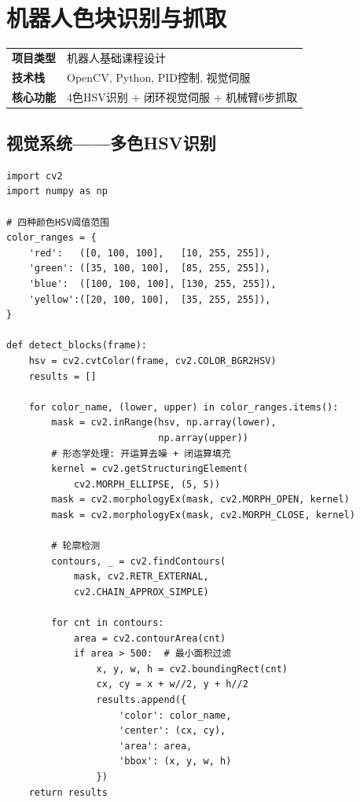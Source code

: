 \documentclass[12pt,a4paper]{ctexart}
\begin{document}
\newpage
\section{机器人色块识别与抓取}

\begin{infobox}[项目概况]
\begin{tabular}{ll}
\textbf{项目类型} & 机器人基础课程设计 \\
\textbf{技术栈}   & OpenCV, Python, PID控制, 视觉伺服 \\
\textbf{核心功能} & 4色HSV识别 + 闭环视觉伺服 + 机械臂6步抓取
\end{tabular}
\end{infobox}

\subsection{视觉系统——多色HSV识别}

\begin{lstlisting}[style=pythonstyle, caption={OpenCV多色HSV空间色块检测}]
import cv2
import numpy as np

# 四种颜色HSV阈值范围
color_ranges = {
    'red':   ([0, 100, 100],   [10, 255, 255]),
    'green': ([35, 100, 100],  [85, 255, 255]),
    'blue':  ([100, 100, 100], [130, 255, 255]),
    'yellow':([20, 100, 100],  [35, 255, 255]),
}

def detect_blocks(frame):
    hsv = cv2.cvtColor(frame, cv2.COLOR_BGR2HSV)
    results = []

    for color_name, (lower, upper) in color_ranges.items():
        mask = cv2.inRange(hsv, np.array(lower),
                           np.array(upper))
        # 形态学处理: 开运算去噪 + 闭运算填充
        kernel = cv2.getStructuringElement(
            cv2.MORPH_ELLIPSE, (5, 5))
        mask = cv2.morphologyEx(mask, cv2.MORPH_OPEN, kernel)
        mask = cv2.morphologyEx(mask, cv2.MORPH_CLOSE, kernel)

        # 轮廓检测
        contours, _ = cv2.findContours(
            mask, cv2.RETR_EXTERNAL,
            cv2.CHAIN_APPROX_SIMPLE)

        for cnt in contours:
            area = cv2.contourArea(cnt)
            if area > 500:  # 最小面积过滤
                x, y, w, h = cv2.boundingRect(cnt)
                cx, cy = x + w//2, y + h//2
                results.append({
                    'color': color_name,
                    'center': (cx, cy),
                    'area': area,
                    'bbox': (x, y, w, h)
                })
    return results
\end{lstlisting}
\end{document}
